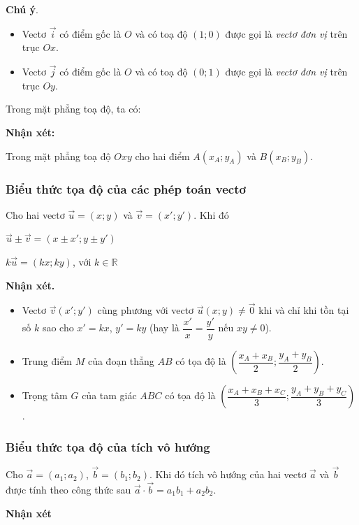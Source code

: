 \textbf{Chú ý}.
\begin{itemize}
	\item Vectơ $\vec{i}$ có điểm gốc là $O$ và có toạ độ $(1;0)$ được gọi là \textit{vectơ đơn vị} trên trục $Ox$.
	\item Vectơ $\vec{j}$ có điểm gốc là $O$ và có toạ độ $(0;1)$ được gọi là \textit{vectơ đơn vị} trên trục $Oy$.
\end{itemize}
\begin{boxdn}
	Trong mặt phẳng toạ độ, ta có:
\end{boxdn}
\textbf{Nhận xét:} 
\begin{boxdn}
	Trong mặt phẳng toạ độ $Oxy$ cho hai điểm $A(x_A;y_A)$ và $B(x_B;y_B)$. \begin{center}
	\end{center}
\end{boxdn}
\subsubsection{Biểu thức tọa độ của các phép toán vectơ}
\begin{boxdn}
	Cho hai vectơ $\vec{u}=(x;y)$ và $\vec{v}=(x';y')$. Khi đó
	\begin{listEX}[2]
		\item $\vec{u}\pm \vec{v}=(x\pm x';y\pm y')$
		\item $k\vec{u}=(kx;ky)$, với $k\in\mathbb{R}$
	\end{listEX}
\end{boxdn}
\textbf{Nhận xét.}
\begin{itemize}
	\item Vectơ $\vec{v}(x';y')$ cùng phương với vectơ $\vec{u}(x;y)\neq \vec{0}$ khi và chỉ khi tồn tại số $k$ sao cho $x'=kx$, $y'=ky$ (hay là $\dfrac{x'}{x}=\dfrac{y'}{y}$ nếu $xy\neq 0$).
	\item Trung điểm $M$ của đoạn thẳng $AB$ có tọa độ là $\left(\dfrac{x_A+x_B}{2};\dfrac{y_A+y_B}{2}\right)$.
	\item Trọng tâm $G$ của tam giác $ABC$ có tọa độ là $\left(\dfrac{x_A+x_B+x_C}{3};\dfrac{y_A+y_B+y_C}{3}\right)$.
\end{itemize}
\subsubsection{Biểu thức tọa độ của tích vô hướng}
\begin{boxdn}{}
	Cho $\overrightarrow{a} = (a_1; a_2)$, $\overrightarrow{b} = (b_1; b_2)$. Khi đó tích vô hướng của hai vectơ $\overrightarrow{a}$ và $\overrightarrow{b}$ được tính theo công thức sau $\overrightarrow{a} \cdot \overrightarrow{b} = a_1b_1 + a_2b_2$.
\end{boxdn}
\textbf{Nhận xét}

